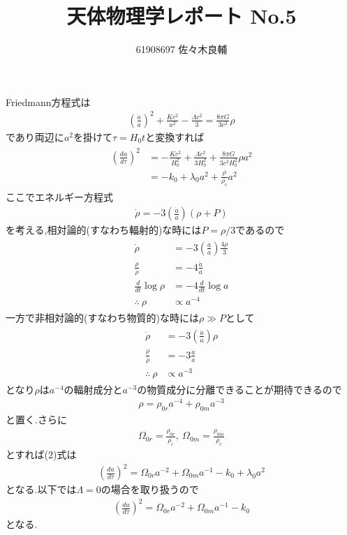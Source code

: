 \documentclass[uplatex,a4j,11pt,dvipdfmx]{jsarticle}
\begin{document}
\title{天体物理学レポート No.5}
\author{61908697 佐々木良輔}
\date{}
\maketitle
Friedmann方程式は
\begin{align}
  \left(\frac{\dot{a}}{a}\right)^2+\frac{Kc^2}{a^2}-\frac{\Lambda c^2}{3}=\frac{8\pi G}{3c^2}\rho
\end{align}
であり両辺に$a^2$を掛けて$\tau=H_0t$と変換すれば
\begin{align}
  \begin{split}
    \left(\frac{da}{d\tau}\right)^2&=-\frac{Kc^2}{H_0^2}+\frac{\Lambda c^2}{3H_0^2}+\frac{8\pi G}{3c^2H_0^2}\rho a^2\\
    &=-k_0+\lambda_0a^2+\frac{\rho}{\rho_c}a^2
  \end{split}
\end{align}
ここでエネルギー方程式
\begin{align}
  \dot{\rho}=-3\left(\frac{\dot{a}}{a}\right)(\rho+P)
\end{align}
を考える,相対論的(すなわち輻射的)な時には$P=\rho/3$であるので
\begin{align}
  \begin{split}
    \dot{\rho}&=-3\left(\frac{\dot{a}}{a}\right)\frac{4\rho}{3}\\
    \frac{\dot{\rho}}{\rho}&=-4\frac{\dot{a}}{a}\\
    \frac{d}{dt}\log\rho&=-4\frac{d}{dt}\log a\\
    \therefore\ \rho&\propto a^{-4}
  \end{split}
\end{align}
一方で非相対論的(すなわち物質的)な時には$\rho\gg P$として
\begin{align}
  \begin{split}
    \dot{\rho}&=-3\left(\frac{\dot{a}}{a}\right)\rho\\
    \frac{\dot{\rho}}{\rho}&=-3\frac{\dot{a}}{a}\\
    \therefore\ \rho&\propto a^{-3}
  \end{split}
\end{align}
となり$\rho$は$a^{-4}$の輻射成分と$a^{-3}$の物質成分に分離できることが期待できるので
\begin{align}
  \rho=\rho_{0r}a^{-4}+\rho_{0m}a^{-3}
\end{align}
と置く.さらに
\begin{align}
  \Omega_{0r}=\frac{\rho_{0r}}{\rho_c},\ \Omega_{0m}=\frac{\rho_{0m}}{\rho_c}
\end{align}
とすれば(2)式は
\begin{align}
  \left(\frac{da}{d\tau}\right)^2=\Omega_{0r}a^{-2}+\Omega_{0m}a^{-1}-k_0+\lambda_0a^2
\end{align}
となる.以下では$\Lambda=0$の場合を取り扱うので
\begin{align}
  \left(\frac{da}{d\tau}\right)^2=\Omega_{0r}a^{-2}+\Omega_{0m}a^{-1}-k_0
\end{align}
となる.
\end{document}
